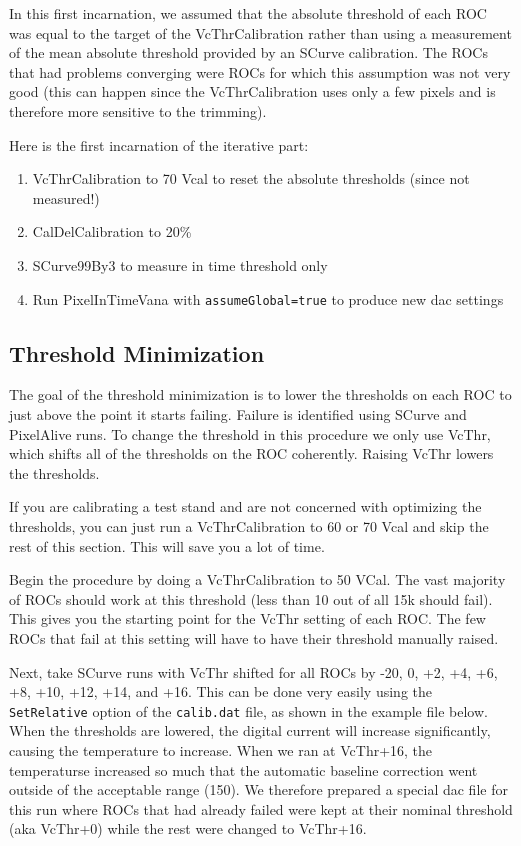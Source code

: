 In this first incarnation, we assumed that the absolute threshold of each ROC was equal
to the target of the VcThrCalibration rather than using a measurement of the mean absolute threshold
provided by an SCurve calibration.  The ROCs that had problems converging were ROCs for which this assumption 
was not very good (this can happen since the VcThrCalibration uses only a few pixels and is therefore 
more sensitive to the trimming).

Here is the first incarnation of the iterative part:
\begin{enumerate}
  \item VcThrCalibration to 70 Vcal to reset the absolute thresholds (since not measured!)
  \item CalDelCalibration to 20\%
  \item SCurve99By3 to measure in time threshold only
  \item Run PixelInTimeVana with \verb|assumeGlobal=true| to produce new dac settings
\end{enumerate}

\subsection{Threshold Minimization}

The goal of the threshold minimization is to lower the thresholds on each ROC
to just above the point it starts failing. Failure is identified using SCurve
and PixelAlive runs. 
To change the threshold in this procedure
we only use VcThr, which shifts all of the thresholds on the ROC coherently.  
Raising VcThr lowers the thresholds.

If you are calibrating a test stand and are not concerned with optimizing
the thresholds, you can just run a VcThrCalibration to 60 or 70 Vcal and skip
the rest of this section.  This will save you a lot of time.

Begin the procedure by doing a VcThrCalibration to 50 VCal.  The vast majority of
ROCs should work at this threshold (less than 10 out of all 15k should fail).  This gives
you the starting point for the VcThr setting of each ROC.
The few ROCs that fail at this setting will have to have their threshold manually raised.

Next, take SCurve runs with VcThr shifted for all ROCs by -20, 0, +2, +4, +6, +8,
+10, +12, +14, and +16.  This can be done very easily using the \verb|SetRelative| option
of the \verb|calib.dat| file, as shown in the example file below.  When the thresholds
are lowered, the digital current will increase significantly, 
causing the temperature to increase.  When we ran at VcThr+16, the temperaturse
increased so much that the automatic baseline correction went outside 
of the acceptable range (150).
We therefore prepared a special dac file for this run where ROCs that had already
failed were kept at their nominal threshold (aka VcThr+0) while the rest were changed
to VcThr+16. 

